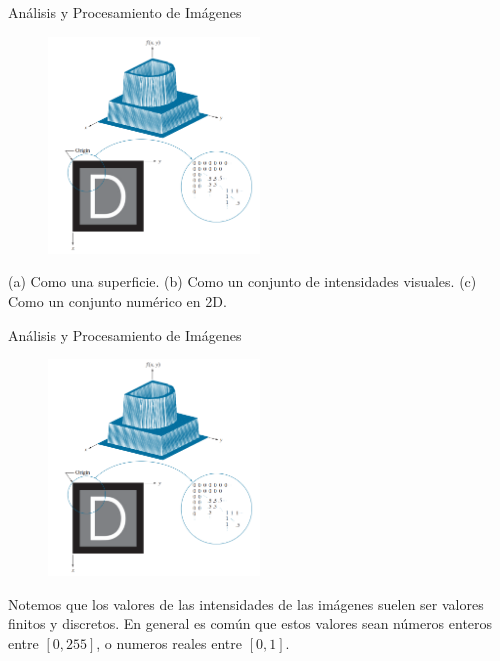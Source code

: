\documentclass{beamer}
\begin{document}
\begin{frame}{Análisis y Procesamiento de Imágenes}
    \begin{figure}[H]
        \centering
        \includegraphics[width=0.5\textwidth]{dip_4_fig2_18.png}
    \end{figure}   
    \pause     
    (a) Como una superficie. 
    \pause 
    (b) Como un conjunto de intensidades visuales. 
    \pause 
    (c) Como un conjunto numérico en 2D. 

\end{frame}

\begin{frame}{Análisis y Procesamiento de Imágenes}
    \begin{figure}[H]
        \centering
        \includegraphics[width=0.5\textwidth]{dip_4_fig2_18.png}
    \end{figure}   


    Notemos que los valores de las intensidades de las imágenes suelen ser valores finitos y discretos. En general es común que estos valores sean números enteros entre $[0, 255]$, o numeros reales entre $[0, 1]$.

\end{frame}
\end{document}
